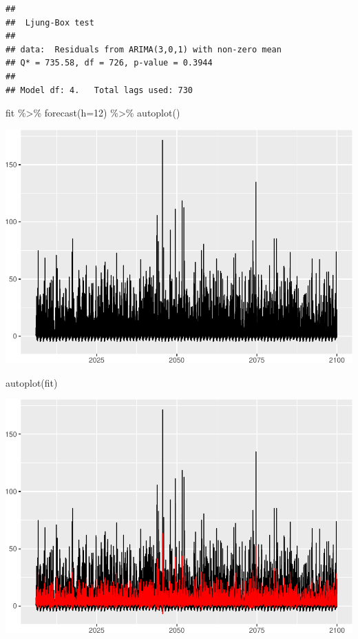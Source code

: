 \documentclass[
  paper=a4,
  ,captions=tableheading
]{scrartcl}
\newenvironment{Shaded}{\begin{snugshade}}{\end{snugshade}}
\newcommand{\AttributeTok}[1]{\textcolor[rgb]{0.77,0.63,0.00}{#1}}
\newcommand{\DecValTok}[1]{\textcolor[rgb]{0.00,0.00,0.81}{#1}}
\newcommand{\FunctionTok}[1]{\textcolor[rgb]{0.00,0.00,0.00}{#1}}
\newcommand{\NormalTok}[1]{#1}
\newcommand{\SpecialCharTok}[1]{\textcolor[rgb]{0.00,0.00,0.00}{#1}}
\begin{document}
\begin{verbatim}
## 
##  Ljung-Box test
## 
## data:  Residuals from ARIMA(3,0,1) with non-zero mean
## Q* = 735.58, df = 726, p-value = 0.3944
## 
## Model df: 4.   Total lags used: 730
\end{verbatim}

\begin{Shaded}
\begin{Highlighting}[]
\NormalTok{fit }\SpecialCharTok{\%\textgreater{}\%} \FunctionTok{forecast}\NormalTok{(}\AttributeTok{h=}\DecValTok{12}\NormalTok{) }\SpecialCharTok{\%\textgreater{}\%} \FunctionTok{autoplot}\NormalTok{()}
\end{Highlighting}
\end{Shaded}

\includegraphics{Haskell_files/figure-latex/unnamed-chunk-91-1.pdf}

\begin{Shaded}
\begin{Highlighting}[]
\FunctionTok{autoplot}\NormalTok{(fit)}
\end{Highlighting}
\end{Shaded}

\includegraphics{Haskell_files/figure-latex/unnamed-chunk-91-2.pdf}
\end{document}
